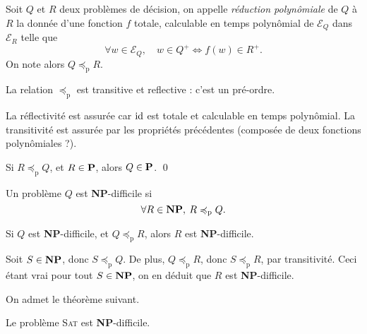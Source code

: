\begin{defn}
	Soit $Q$\/ et $R$\/ deux problèmes de décision, on appelle \textit{réduction polynômiale} de $Q$\/ à $R$\/ la donnée d'une fonction $f$\/ totale, calculable en temps polynômial de $\mathcal{E}_Q$\/ dans $\mathcal{E}_R$\/ telle que \[
		\forall w \in \mathcal{E}_Q,\quad w \in Q^+ \iff f(w) \in R^+
	.\]
	On note alors $Q \preceq_{\mathrm{p}} R$.
\end{defn}

\begin{prop}
	La relation $\preceq_{\mathrm{p}}$\/ est transitive et reflective : c'est un pré-ordre.
\end{prop}

\begin{prv}
	La réflectivité est assurée car $\id$\/ est totale et calculable en temps polynômial.
	La transitivité est assurée par les propriétés précédentes (composée de deux fonctions polynômiales ?).
\end{prv}

\begin{prop}
	Si $R \preceq_{\mathrm{p}} Q$, et $R \in \text{\textbf{P}}$, alors $Q \in \text{\textbf{P}}$.
	\qed
\end{prop}

\begin{defn}
	Un problème $Q$\/ est \textbf{NP}-difficile si \[
		\forall R \in \text{\textbf{NP}},\:R \preceq_{\mathrm{p}} Q
	.\]
\end{defn}

\begin{prop}
	Si $Q$\/ est \textbf{NP}-difficile, et $Q \preceq_{\mathrm{p}} R$, alors $R$\/ est \textbf{NP}-difficile.
\end{prop}

\begin{prv}
	Soit $S \in \text{\textbf{NP}}$, donc $S \preceq_{\mathrm{p}} Q$. De plus, $Q \preceq_\mathrm{p} R$, donc $S \preceq_\mathrm{p} R$, par transitivité. Ceci étant vrai pour tout $S \in \text{\textbf{NP}}$, on en déduit que $R$\/ est \textbf{NP}-difficile.
\end{prv}

On admet le théorème suivant.

\begin{thm}
	Le problème \textsc{Sat} est \textbf{NP}-difficile.
\end{thm}

